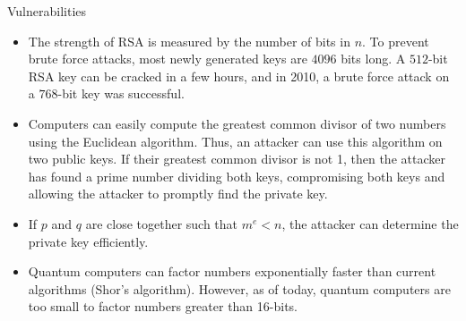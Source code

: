 \documentclass{beamer}
\begin{document}
\begin{frame}{Vulnerabilities}
    \begin{itemize}
        \item The strength of RSA is measured by the number of bits in $n$. To prevent brute force attacks, most newly generated keys are $4096$ bits long. A $512$-bit RSA key can be cracked in a few hours, and in 2010, a brute force attack on a $768$-bit key was successful.
        \item Computers can easily compute the greatest common divisor of two numbers using the Euclidean algorithm. Thus, an attacker can use this algorithm on two public keys. If their greatest common divisor is not 1, then the attacker has found a prime number dividing both keys, compromising both keys and allowing the attacker to promptly find the private key.
        \item If $p$ and $q$ are close together such that $m^{e} < n$, the attacker can determine the private key efficiently.
        \item Quantum computers can factor numbers exponentially faster than current algorithms (Shor's algorithm). However, as of today, quantum computers are too small to factor numbers greater than 16-bits.
    \end{itemize}
\end{frame}





    
    
    
\end{document}
